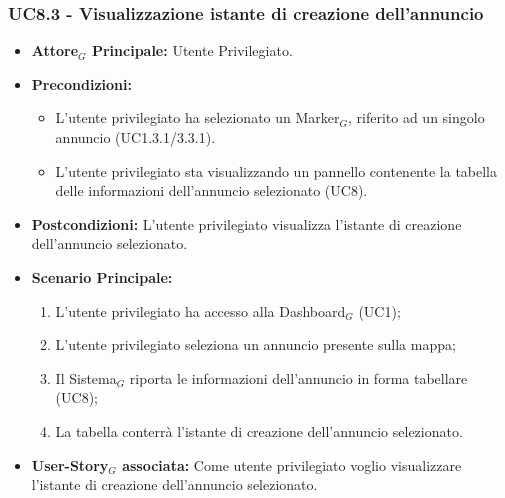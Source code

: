 \documentclass[10pt]{article}
\begin{document}
\begin{justify}
 \subsubsection{\textbf{UC8.3 - Visualizzazione istante di creazione dell'annuncio}}
 \begin{itemize}
     \item \textbf{Attore$_G$ Principale:} Utente Privilegiato.
     \item \textbf{Precondizioni:}
       \begin{itemize}
    	        \item L'utente privilegiato ha selezionato un Marker$_G$, riferito ad un singolo annuncio (UC1.3.1/3.3.1).
          \item L'utente privilegiato sta visualizzando un pannello contenente la tabella delle informazioni dell'annuncio selezionato (UC8).
       \end{itemize}
     \item \textbf{Postcondizioni:} L'utente privilegiato visualizza l'istante di creazione dell'annuncio selezionato.
     \item \textbf{Scenario Principale:}
        \begin{enumerate}
            \item L'utente privilegiato ha accesso alla Dashboard$_G$ (UC1);
            \item L'utente privilegiato seleziona un annuncio presente sulla mappa;
            \item Il Sistema$_G$ riporta le informazioni dell'annuncio in forma tabellare (UC8);
            \item La tabella conterrà l'istante di creazione dell'annuncio selezionato.
        \end{enumerate}
     \item \textbf{User-Story$_G$ associata:} Come utente privilegiato voglio visualizzare l'istante di creazione dell'annuncio selezionato. 
 \end{itemize}

\end{justify}
\end{document}
